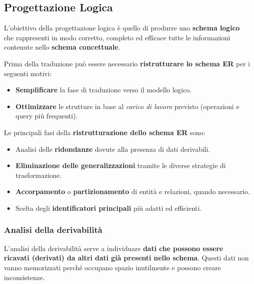 \subsection{Progettazione Logica}

L’obiettivo della progettazione logica è quello di produrre uno \textbf{schema logico} che rappresenti in modo corretto, completo ed efficace tutte le informazioni contenute nello \textbf{schema concettuale}.

Prima della traduzione può essere necessario \textbf{ristrutturare lo schema ER} per i seguenti motivi:
\begin{itemize}
    \item \textbf{Semplificare} la fase di traduzione verso il modello logico.
    \item \textbf{Ottimizzare} le strutture in base al \textit{carico di lavoro} previsto (operazioni e query più frequenti).
\end{itemize}

Le principali fasi della \textbf{ristrutturazione dello schema ER} sono:
\begin{itemize}
    \item Analisi delle \textbf{ridondanze} dovute alla presenza di dati derivabili.
    \item \textbf{Eliminazione delle generalizzazioni} tramite le diverse strategie di trasformazione.
    \item \textbf{Accorpamento} o \textbf{partizionamento} di entità e relazioni, quando necessario.
    \item Scelta degli \textbf{identificatori principali} più adatti ed efficienti.
\end{itemize}

\subsubsection{Analisi della derivabilità}

L’analisi della derivabilità serve a individuare \textbf{dati che possono essere ricavati (derivati) da altri dati già presenti nello schema}.  
Questi dati non vanno memorizzati perché occupano spazio inutilmente e possono creare inconsistenze.

